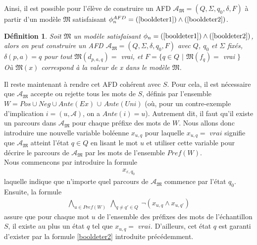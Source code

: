 \documentclass[12pt,a4paper,oneside,titlepage]{report}
\newtheorem{defi}{D\'efinition}[section]
\begin{document}
\noindent Ainsi, il est possible pour l'élève de construire un AFD $\mathcal{A}_\mathfrak{M}=(Q,\Sigma,q_0,\delta,F)$ à partir d'un modèle $\mathfrak{M}$ satisfaisant $\phi_n^{AFD}=(\ref{booldeter1})\land(\ref{booldeter2})$.
\begin{defi}
\label{translate}
Soit $\mathfrak{M}$ un modèle satisfaisant $\phi_n=(\ref{booldeter1})\land(\ref{booldeter2})$, alors on peut construire un AFD $\mathcal{A}_\mathfrak{M}=(Q,\Sigma,\delta,q_0,F)$ avec $Q$, $q_0$ et $\Sigma$ fixés, $\delta(p,a)=q$ pour tout $\mathfrak{M}(d_{p,a,q})=$ vrai, et $F=\{q\in Q$ $|$ $\mathfrak{M}(f_q)=$ vrai $\}$\\
Où $\mathfrak{M}(x)$ correspond à la valeur de x dans le modèle $\mathfrak{M}$.
\end{defi}
Il reste maintenant à rendre cet AFD cohérent avec $S$. Pour cela, il est nécessaire que $\mathcal{A}_\mathfrak{M}$ accepte ou rejette tous les mots de $S$, définis par l'ensemble $W=Pos\cup Neg\cup Ante(Ex)$ $\cup$ $Ante(Uni)$ (où, pour un contre-exemple d'implication $i=(u,\mathcal{A})$, on a $Ante(i)=u$). Autrement dit, il faut qu'il existe un parcours dans $\mathcal{A}_\mathfrak{M}$ pour chaque préfixe des mots de $W$. Nous allons donc introduire une nouvelle variable boléenne $x_{u,q}$ pour laquelle $x_{u,q}=$ $vrai$ signifie que $\mathcal{A}_\mathfrak{M}$ atteint l'état $q\in Q$ en lisant le mot $u$ et utiliser cette variable pour décrire le parcours de $\mathcal{A}_\mathfrak{M}$ par les mots de l'ensemble $Pref(W)$.\\

\noindent Nous commencons par introduire la formule
\begin{equation}
\label{boolW1}
\begin{aligned} x_{\varepsilon , q_0} \end{aligned}
\end{equation}
laquelle indique que n'importe quel parcours de $\mathcal{A}_\mathfrak{M}$ commence par l'état $q_0$.\\ 
Ensuite, la formule
\begin{equation}
\label{boolW2}
\begin{aligned} \bigwedge _{u \in Pref (W)}~ \bigwedge _{q \ne q' \in Q}~ \neg (x_{u, q} \land x_{u,q'}) \end{aligned}
\end{equation}
assure que pour chaque mot $u$ de l'ensemble des préfixes des mots de l'échantillon $S$, il existe au plus un état $q$ tel que $x_{u,q}=$ $vrai$. D'ailleurs, cet état $q$ est garanti d'exister par la formule \ref{booldeter2} introduite précédemment.
\end{document}
